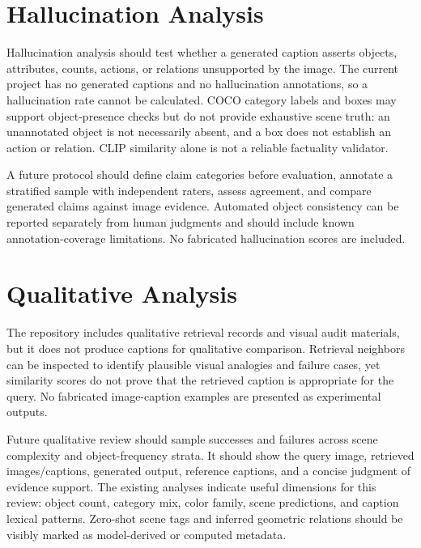 \section{Hallucination Analysis}\label{ch:hallucination}
Hallucination analysis should test whether a generated caption asserts objects, attributes, counts, actions, or relations unsupported by the image. The current project has no generated captions and no hallucination annotations, so a hallucination rate cannot be calculated. COCO category labels and boxes may support object-presence checks but do not provide exhaustive scene truth: an unannotated object is not necessarily absent, and a box does not establish an action or relation. CLIP similarity alone is not a reliable factuality validator.

A future protocol should define claim categories before evaluation, annotate a stratified sample with independent raters, assess agreement, and compare generated claims against image evidence. Automated object consistency can be reported separately from human judgments and should include known annotation-coverage limitations. No fabricated hallucination scores are included.

\section{Qualitative Analysis}\label{ch:qualitative}
The repository includes qualitative retrieval records and visual audit materials, but it does not produce captions for qualitative comparison. Retrieval neighbors can be inspected to identify plausible visual analogies and failure cases, yet similarity scores do not prove that the retrieved caption is appropriate for the query. No fabricated image-caption examples are presented as experimental outputs.

Future qualitative review should sample successes and failures across scene complexity and object-frequency strata. It should show the query image, retrieved images/captions, generated output, reference captions, and a concise judgment of evidence support. The existing analyses indicate useful dimensions for this review: object count, category mix, color family, scene predictions, and caption lexical patterns. Zero-shot scene tags and inferred geometric relations should be visibly marked as model-derived or computed metadata.
